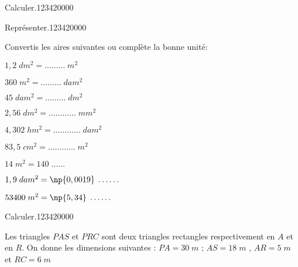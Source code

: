 \begin{pageAuto}
\begin{ExoAuto}{Calculer.}{1234}{2}{0}{0}{0}{0}
\begin{minipage}{0.38\linewidth}
\end{minipage}

 
\end{ExoAuto}

\begin{ExoAuto}{Représenter.}{1234}{2}{0}{0}{0}{0}
 

Convertis les aires suivantes ou complète la bonne unité:\vspace{0.4cm}

\begin{minipage}{0.25\linewidth}
$1,2\; dm^2 =  \ldots\ldots\ldots \;m^2$ \vspace{0.4cm}
 
$360\; m^2  =\ldots\ldots\ldots \;dam^2$\vspace{0.4cm}
 
$45\; dam^2  = \ldots\ldots\ldots  \;dm^2$
 
\end{minipage}
\hfill
\begin{minipage}{0.33\linewidth}
 
$2,56 \;dm^2  = \ldots \ldots\ldots\ldots\;  mm^2$\vspace{0.4cm}
 
$4,302\; hm^2  = \ldots \ldots\ldots\ldots  \; dam^2$\vspace{0.4cm}

$83,5\; cm^2  =  \ldots \ldots\ldots\ldots\; m^2$
 \end{minipage}
\hfill
\begin{minipage}{0.28\linewidth}
 
$14\; m^2  = 140 \; \ldots \ldots$\vspace{0.4cm}
 
$1,9 \;dam^2  = \np{0,0019}\; \ldots \ldots $\vspace{0.4cm}

$53400 \;m^2  = \np{5,34}\; \ldots \ldots  $
 \end{minipage}


\end{ExoAuto}

\begin{ExoAuto}{Calculer.}{1234}{2}{0}{0}{0}{0}

\begin{minipage}{0.58\linewidth}

Les triangles $PAS$ et $PRC$ sont deux triangles rectangles respectivement en $A$ et en $R$. On donne les dimensions suivantes : 
$PA =30 \; m$ ; $AS = 18 \; m$ , $AR = 5\; m$ et $RC = 6\; m$ 


\end{minipage}
\end{ExoAuto}
\end{pageAuto}
